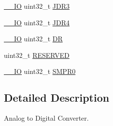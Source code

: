 \begin{DoxyCompactItemize}
\item 
\hyperlink{core__sc300_8h_aec43007d9998a0a0e01faede4133d6be}{\-\_\-\-\_\-\-I\-O} uint32\-\_\-t \hyperlink{struct_a_d_c___type_def_a40999cd0a255ef62b2340e2726695063}{J\-D\-R3}
\item 
\hyperlink{core__sc300_8h_aec43007d9998a0a0e01faede4133d6be}{\-\_\-\-\_\-\-I\-O} uint32\-\_\-t \hyperlink{struct_a_d_c___type_def_abae6e9d688b16ef350878998f5e21c0b}{J\-D\-R4}
\item 
\hyperlink{core__sc300_8h_aec43007d9998a0a0e01faede4133d6be}{\-\_\-\-\_\-\-I\-O} uint32\-\_\-t \hyperlink{struct_a_d_c___type_def_a84114accead82bd11a0e12a429cdfed9}{D\-R}
\item 
uint32\-\_\-t \hyperlink{struct_a_d_c___type_def_a42da90f4569cf1a052f1d26e409bf917}{R\-E\-S\-E\-R\-V\-E\-D}
\item 
\hyperlink{core__sc300_8h_aec43007d9998a0a0e01faede4133d6be}{\-\_\-\-\_\-\-I\-O} uint32\-\_\-t \hyperlink{struct_a_d_c___type_def_afaad4e722a535b9881668f07b898daa2}{S\-M\-P\-R0}
\end{DoxyCompactItemize}


\subsection{Detailed Description}
Analog to Digital Converter. 

